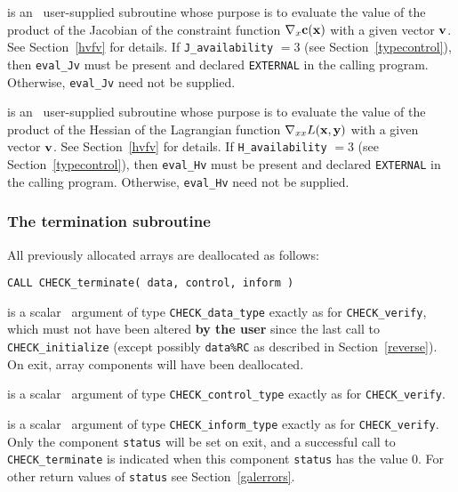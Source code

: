 \documentclass{galahad}
\newcommand{\packagename}{CHECK}
\begin{document}
\begin{description}
 is an \optional\ 
user-supplied subroutine whose purpose is to evaluate the value of the 
product of the Jacobian of the constraint function 
$\nabla_x {\mathbf{c}}({\mathbf{x}})$ with a given vector ${\mathbf{v}}$.
See Section~\ref{hvfv} for details.
If {\tt J\_availability} $=3$ (see Section~\ref{typecontrol}), then {\tt eval\_Jv} must be present and
declared {\tt EXTERNAL} in the calling program.
Otherwise, {\tt eval\_Jv} need not be supplied.

 is an \optional\ 
user-supplied subroutine whose purpose is to evaluate the value of the 
product of the Hessian of the Lagrangian function 
$\nabla_{xx} L({\mathbf{x}},{\mathbf{y}})$ with a given vector ${\mathbf{v}}$.
See Section~\ref{hvfv} for details.
If {\tt H\_availability} $=3$ (see Section~\ref{typecontrol}), then {\tt eval\_Hv} must be present and
declared {\tt EXTERNAL} in the calling program.
Otherwise, {\tt eval\_Hv} need not be supplied.

\end{description}


\subsubsection{The  termination subroutine}
All previously allocated arrays are deallocated as follows:
\vspace*{1mm}

\hspace{8mm}
{\tt CALL \packagename\_terminate( data, control, inform )}

\vspace*{-1mm}
\begin{description}

 is a scalar \intentinout\ argument of type 
{\tt \packagename\_data\_type} 
exactly as for
{\tt \packagename\_verify},
which must not have been altered {\bf by the user} since the last call to 
{\tt \packagename\_initialize} (except possibly {\tt data\%RC} as
described in Section~\ref{reverse}).
On exit, array components will have been deallocated.

 is a scalar \intentin\ argument of type 
{\tt \packagename\_control\_type}
exactly as for
{\tt \packagename\_verify}.

 is a scalar \intentout\ argument of type
{\tt \packagename\_inform\_type}
exactly as for
{\tt \packagename\_verify}.
Only the component {\tt status} will be set on exit, and a 
successful call to 
{\tt \packagename\_terminate}
is indicated when this  component {\tt status} has the value 0. 
For other return values of {\tt status} see Section~\ref{galerrors}.

\end{description}
\end{document}
